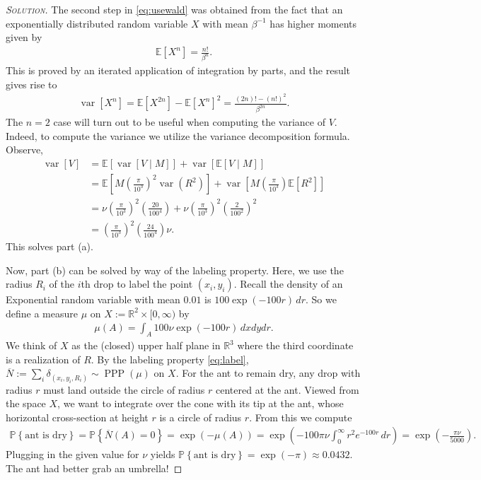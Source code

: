 \documentclass[../../../Master/AppliedStochastics.tex]{subfiles}
\newenvironment{soln}{\begin{proof}[\textsc{Solution}]}{\renewcommand{\qedsymbol}{$\blacklozenge$}\end{proof}}
\begin{document}
\begin{example}
\begin{soln}
	The second step in \eqref{eq:usewald} was obtained from the fact that an 
	exponentially distributed random variable $X$ with mean $\beta^{-1}$ has 
	higher moments given by
	\begin{align}
		\mathbb{E}\left[ X^n \right] = \frac{n!}{\beta^n}.
	\end{align}
	This is proved by an iterated application of integration by parts, and the 
	result gives rise to 
	\begin{align}
		\operatorname{var}\left[ X^n \right] = \mathbb{E}\left[ X^{2n} \right] 
		- \mathbb{E}\left[ X^n \right]^2 = \frac{(2n)! - (n!)^2}{\beta^{2n}}.
	\end{align}
	The $n=2$ case will turn out to be useful when computing the variance of 
	$V$.
	\newpage
	Indeed, to compute the variance we utilize the variance decomposition 
	formula. Observe,
	\begin{align}
		\operatorname{var}[V] &= \mathbb{E}\left[ \operatorname{var}[V \mid 
		M]\right] + \operatorname{var}\left[ \mathbb{E}[V \mid M ]\right]\\
		&= \mathbb{E}\left[ 
		M\left(\frac{\pi}{10^3}\right)^2\operatorname{var}(R^2)\right] + 
		\operatorname{var}\left[ 
		M\left(\frac{\pi}{10^3}\right)\mathbb{E}[R^2]\right]\\
		&= \nu \left(\frac{\pi}{10^3}\right)^2 \left(\frac{20}{100^4}\right) + 
		\nu\left(\frac{\pi}{10^3}\right)^2 \left(\frac{2}{100^2}\right)^2\\
		&= \left(\frac{\pi}{10^3}\right)^2\left(\frac{24}{100^4}\right)\nu.
	\end{align}
	This solves part (a).
	
	Now, part (b) can be solved by way of the labeling property. Here, we use 
	the radius $R_i$ of the $i$th drop to label the point $(x_i,y_i)$. Recall 
	the density of an Exponential random variable with mean $0.01$ is 
	$100\exp(-100r)\,dr$. So we define a measure $\mu$ on 
	$X:=\mathbb{R}^2\times [0,\infty)$ by
	\begin{align}
		\mu(A) = \int_A\! 100\nu\exp(-100r)\, dxdydr.
	\end{align} 
	We think of $X$ as the (closed) upper half plane in $\mathbb{R}^3$ where 
	the third coordinate is a realization of $R$. By the labeling property 
	\eqref{eq:label}, $\overline{N} := \sum_i \delta_{(x_i,y_i,R_i)} \sim 
	\operatorname{PPP}(\mu)$ on $X$. For the ant to remain dry, any drop with 
	radius $r$ must land outside the circle of radius $r$ centered at the ant. 
	Viewed from the space $X$, we want to integrate over the cone with its tip 
	at the ant, whose horizontal cross-section at height $r$ is a circle of 
	radius $r$. From this we compute
	\begin{align}
		\mathbb{P}\left\{\text{ant is dry}\right\} = 
		\mathbb{P}\left\{\overline{N}(A) = 0\right\}
		= \exp(-\mu(A))
		= \exp\left(-100\pi\nu\int_0^\infty\! r^2e^{-100r}\,dr\right)
		= \exp\left( -\frac{\pi\nu}{5000} \right).
	\end{align}
	Plugging in the given value for $\nu$ yields $\mathbb{P}\left\{\text{ant is 
	dry}\right\} = \exp(-\pi) \approx 0.0432$. The ant had better grab an 
	umbrella!
\end{soln}
\end{example}
\end{document}
